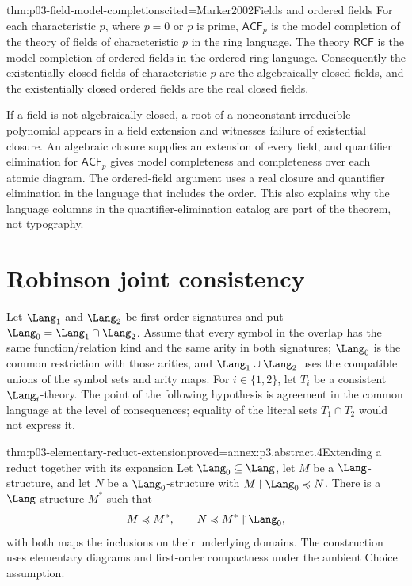 \begin{hbtheorem}{thm:p03-field-model-completions}{cited=Marker2002}{Fields and ordered fields}
For each characteristic \(p\), where \(p=0\) or \(p\) is prime,
\(\mathsf{ACF}_p\) is the model completion of the theory of fields of
characteristic \(p\) in the ring language.  The theory \(\mathsf{RCF}\) is
the model completion of ordered fields in the ordered-ring language.
Consequently the existentially closed fields of characteristic \(p\) are the
algebraically closed fields, and the existentially closed ordered fields are
the real closed fields.
\end{hbtheorem}

If a field is not algebraically closed, a root of a nonconstant irreducible
polynomial appears in a field extension and witnesses failure of existential
closure.  An algebraic closure supplies an extension of every field, and
quantifier elimination for \(\mathsf{ACF}_p\) gives model completeness and
completeness over each atomic diagram.  The ordered-field argument uses a real
closure and quantifier elimination in the language that includes the order.
This also explains why the language columns in the quantifier-elimination
catalog are part of the theorem, not typography.

\section{Robinson joint consistency}
\label{sec:p03-robinson-joint-consistency}

Let \(\Lang_1\) and \(\Lang_2\) be first-order signatures and put
\(\Lang_0=\Lang_1\cap\Lang_2\).  Assume that every symbol in the overlap has
the same function/relation kind and the same arity in both signatures;
\(\Lang_0\) is the common restriction with those arities, and
\(\Lang_1\cup\Lang_2\) uses the compatible unions of the symbol sets and arity
maps.  For \(i\in\{1,2\}\), let \(T_i\) be a
consistent \(\Lang_i\)-theory.  The point of the following hypothesis is
agreement in the common language at the level of consequences; equality of
the literal sets \(T_1\cap T_2\) would not express it.

\begin{hblemma}{thm:p03-elementary-reduct-extension}{proved=annex:p3.abstract.4}{Extending a reduct together with its expansion}
Let \(\Lang_0\subseteq\Lang\), let \(M\) be a \(\Lang\)-structure, and
let \(N\) be a \(\Lang_0\)-structure with
\(M\mathbin{\upharpoonright}\Lang_0\preccurlyeq N\).
There is a \(\Lang\)-structure \(M^*\) such that
\[
 M\preccurlyeq M^*,
 \qquad
 N\preccurlyeq M^*\mathbin{\upharpoonright}\Lang_0,
\]
with both maps the inclusions on their underlying domains.
The construction uses elementary diagrams and first-order compactness
under the ambient Choice assumption.
\end{hblemma}

